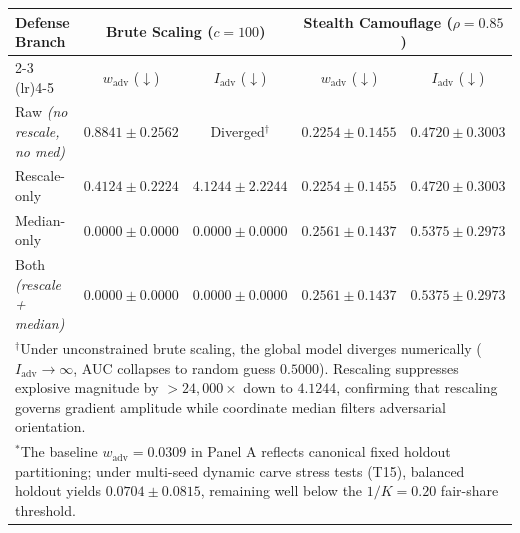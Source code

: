 \begin{table}[!t]
{\begin{tabular}{lcccc}
\midrule
\textbf{Defense Branch} & \multicolumn{2}{c}{\textbf{Brute Scaling ($c=100$)}} & \multicolumn{2}{c}{\textbf{Stealth Camouflage ($\rho=0.85$)}} \\
\cmidrule(lr){2-3} \cmidrule(lr){4-5}
 & $w_{\mathrm{adv}}$ ($\downarrow$) & $I_{\mathrm{adv}}$ ($\downarrow$) & $w_{\mathrm{adv}}$ ($\downarrow$) & $I_{\mathrm{adv}}$ ($\downarrow$) \\
\midrule
Raw \textit{\scriptsize(no rescale, no med)} & $0.8841 \pm 0.2562$ & Diverged$^\dagger$ & $\mathbf{0.2254 \pm 0.1455}$ & $\mathbf{0.4720 \pm 0.3003}$ \\
Rescale-only & $0.4124 \pm 0.2224$ & $\mathbf{4.1244 \pm 2.2244}$ & $\mathbf{0.2254 \pm 0.1455}$ & $\mathbf{0.4720 \pm 0.3003}$ \\
Median-only & $\mathbf{0.0000 \pm 0.0000}$ & $\mathbf{0.0000 \pm 0.0000}$ & $0.2561 \pm 0.1437$ & $0.5375 \pm 0.2973$ \\
Both \textit{\scriptsize(rescale + median)} & $\mathbf{0.0000 \pm 0.0000}$ & $\mathbf{0.0000 \pm 0.0000}$ & $0.2561 \pm 0.1437$ & $0.5375 \pm 0.2973$ \\
\bottomrule
\multicolumn{5}{p{0.95\textwidth}}{\vspace{2pt}\scriptsize $^\dagger$Under unconstrained brute scaling, the global model diverges numerically ($I_{\mathrm{adv}} \to \infty$, AUC collapses to random guess $0.5000$). Rescaling suppresses explosive magnitude by $>24{,}000\times$ down to $4.1244$, confirming that rescaling governs gradient amplitude while coordinate median filters adversarial orientation.} \\
\multicolumn{5}{p{0.95\textwidth}}{\scriptsize $^*$The baseline $w_{\mathrm{adv}} = 0.0309$ in Panel A reflects canonical fixed holdout partitioning; under multi-seed dynamic carve stress tests (T15), balanced holdout yields $0.0704 \pm 0.0815$, remaining well below the $1/K = 0.20$ fair-share threshold.} \\
\end{tabular}%
}
\end{table}
